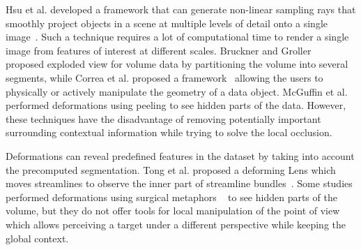 Hsu et al. developed a framework that can generate non-linear sampling rays that smoothly project objects in a scene at multiple levels of detail onto a single image~\cite{Hsu:2011:RFM:2070781.2024165}. Such a technique requires a lot of computational time to render a single image from features of interest at different scales.
  Bruckner and  Groller~\cite{4015467} proposed exploded view for volume data by partitioning the volume into several segments, while Correa et al. proposed a framework~\cite{Correa:2007:IDD:1313046.1313163} allowing the users to physically or actively manipulate the geometry of a data object. McGuffin et al.~\cite{1250400} performed deformations using peeling to see hidden parts of the data. However, these techniques have the disadvantage of removing potentially important surrounding contextual information while trying to solve the local occlusion. 
 
 
Deformations can reveal predefined features in the dataset by taking into account the precomputed segmentation. Tong et al. proposed a deforming Lens which moves streamlines to observe the inner part of streamline bundles~\cite{7332955}. Some studies performed deformations using surgical metaphors ~\cite{4069230,Correa:2006:FAV:1187627.1187827} to see hidden parts of the volume, but they do not offer tools for local manipulation of the point of view which allows perceiving a target under a different perspective while keeping the global context. 

